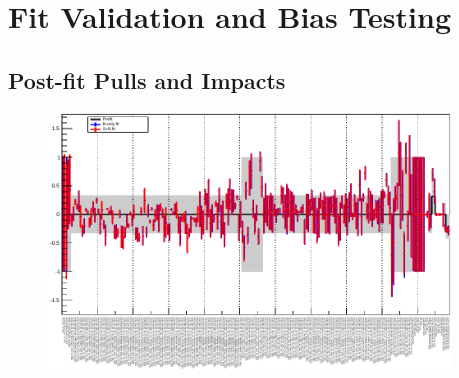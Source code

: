 
\section{Fit Validation and Bias Testing}
\label{sec:bias}

\subsection{Post-fit Pulls and Impacts}

\begin{figure}[htbp]
  \centering
  \includegraphics[width=0.95\textwidth,angle=270]{fig/fitValidation/nuisances_74_WprToWH1000.pdf}
  \caption{
  }
  \label{fig:nuisances}
\end{figure}

